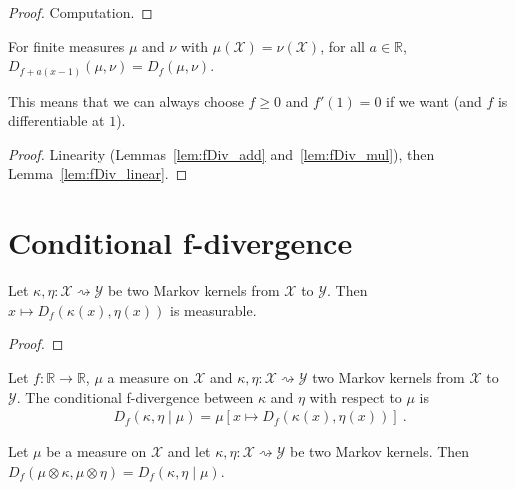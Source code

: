 \begin{proof}
Computation.
\end{proof}

\begin{lemma}
  \label{lem:fDiv_add_linear}
  For finite measures $\mu$ and $\nu$ with $\mu(\mathcal X) = \nu(\mathcal X)$, for all $a \in \mathbb{R}$, $D_{f + a(x - 1)}(\mu, \nu) = D_{f}(\mu, \nu)$.
\end{lemma}

This means that we can always choose $f \ge 0$ and $f'(1) = 0$ if we want (and $f$ is differentiable at $1$).

\begin{proof}
Linearity (Lemmas~\ref{lem:fDiv_add} and~\ref{lem:fDiv_mul}), then Lemma~\ref{lem:fDiv_linear}.
\end{proof}

\section{Conditional f-divergence}

\begin{lemma}
  \label{lem:measurable_fDiv}
  Let $\kappa, \eta : \mathcal X \rightsquigarrow \mathcal Y$ be two Markov kernels from $\mathcal X$ to $\mathcal Y$. Then $x \mapsto D_f(\kappa(x), \eta(x))$ is measurable.
\end{lemma}

\begin{proof}
\end{proof}

\begin{definition}
  \label{def:condFDiv}
  Let $f : \mathbb{R} \to \mathbb{R}$, $\mu$ a measure on $\mathcal X$ and $\kappa, \eta : \mathcal X \rightsquigarrow \mathcal Y$ two Markov kernels from $\mathcal X$ to $\mathcal Y$. The conditional f-divergence between $\kappa$ and $\eta$ with respect to $\mu$ is
  \begin{align*}
  D_f(\kappa, \eta \mid \mu) = \mu\left[x \mapsto D_f(\kappa(x), \eta(x))\right] \: .
  \end{align*}
\end{definition}

\begin{lemma}
  \label{lem:fDiv_compProd_left}
  Let $\mu$ be a measure on $\mathcal X$ and let $\kappa, \eta : \mathcal X \rightsquigarrow \mathcal Y$ be two Markov kernels.
  Then $D_f(\mu \otimes \kappa, \mu \otimes \eta) = D_f(\kappa, \eta \mid \mu)$.
\end{lemma}

